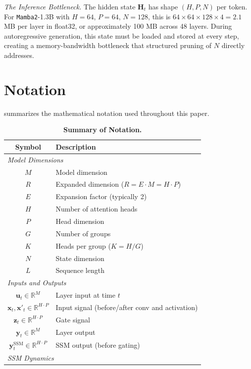 \documentclass{article}
\theoremstyle{plain}
\theoremstyle{definition}
\theoremstyle{remark}
\begin{document}
\textit{The Inference Bottleneck.}
The hidden state $\bm{H}_t$ has shape $(H, P, N)$ per token. 
For \texttt{Mamba2}-1.3B with $H=64$, $P=64$, $N=128$, this is $64 \times 64 \times 128 \times 4 = 2.1$ MB per layer in float32, or approximately 100 MB across 48 layers. During autoregressive generation, this state must be loaded and stored at every step, creating a memory-bandwidth bottleneck that structured pruning of $N$ directly addresses.

\section{Notation}
\label{app:table_notation}

 summarizes the mathematical notation used throughout this paper.

\begin{table}[h]
\centering
\caption{\textbf{Summary of Notation.}}
\label{tab:notation}
\begin{tabular}{cl}
\toprule
\textbf{Symbol} & \textbf{Description} \\
\midrule
\multicolumn{2}{l}{\textit{Model Dimensions}} \\
$M$ & Model dimension \\
$R$ & Expanded dimension ($R = E \cdot M = H \cdot P$) \\
$E$ & Expansion factor (typically 2) \\
$H$ & Number of attention heads \\
$P$ & Head dimension \\
$G$ & Number of groups \\
$K$ & Heads per group ($K = H/G$) \\
$N$ & State dimension \\
$L$ & Sequence length \\
\midrule
\multicolumn{2}{l}{\textit{Inputs and Outputs}} \\
$\bm{u}_t \in \mathbb{R}^M$ & Layer input at time $t$ \\
$\bm{x}_t, \bm{x}'_t \in \mathbb{R}^{H \cdot P}$ & Input signal (before/after conv and activation) \\
$\bm{z}_t \in \mathbb{R}^{H \cdot P}$ & Gate signal \\
$\bm{y}_t \in \mathbb{R}^M$ & Layer output \\
$\bm{y}^{\text{SSM}}_t \in \mathbb{R}^{H \cdot P}$ & SSM output (before gating) \\
\midrule
\multicolumn{2}{l}{\textit{SSM Dynamics}} \\

\end{tabular}
\end{table}
\end{document}
